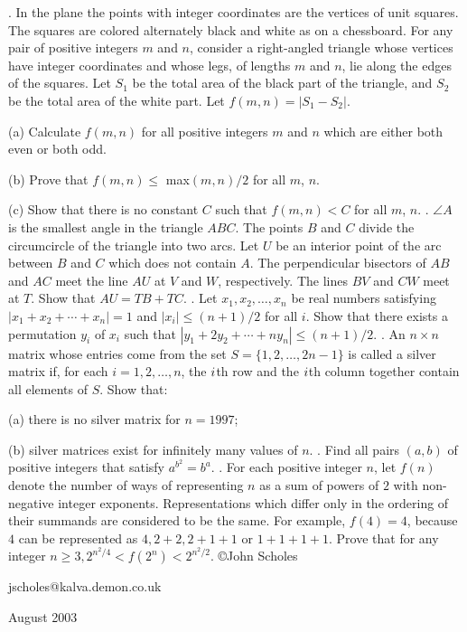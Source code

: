 \nopagenumbers
{}
\vskip 25pt
. In the plane the points with integer coordinates are the vertices of unit squares. The squares are colored alternately black and white as on a chessboard. For any pair of positive integers $m$ and $n$, consider a right-angled triangle whose vertices have integer coordinates and whose legs, of lengths $m$ and $n$, lie along the edges of the squares. Let $S_1$ be the total area of the black part of the triangle, and $S_2$ be the total area of the white part. Let $f(m, n) = |S_1 - S_2|$.

(a) Calculate $f(m,n)$ for all positive integers $m$ and $n$ which are either both even or both odd.

(b) Prove that $f(m,n) \le$ max$(m,n)/2$ for all $m$, $n$.

(c) Show that there is no constant $C$ such that $f(m,n) < C$ for all $m$, $n$.
\vskip 12pt
. $\angle A$ is the smallest angle in the triangle $ABC$. The points $B$ and $C$ divide the circumcircle of the triangle into two arcs. Let $U$ be an interior point of the arc between $B$ and $C$ which does not contain $A$. The perpendicular bisectors of $AB$ and $AC$ meet the line $AU$ at $V$ and $W$, respectively. The lines $BV$ and $CW$ meet at $T$. Show that $AU = TB + TC$.
\vskip 12pt
. Let $x_1, x_2, \ldots , x_n$ be real numbers satisfying $|x_1 + x_2 + \cdots + x_n| = 1$ and $|x_i| \le (n+1)/2$ for all $i$. Show that there exists a permutation $y_i$ of $x_i$ such that $|y_1 + 2 y_2 + \cdots + n y_n| \le (n+1)/2$.
\vskip 12pt
. An $n \times n$ matrix whose entries come from the set $S = \{1, 2, \ldots , 2n-1\}$ is called a silver matrix if, for each $i = 1, 2, \ldots , n$, the $i\/$th row and the $i\/$th column together contain all elements of $S$. Show that:

(a) there is no silver matrix for $n = 1997$;

(b) silver matrices exist for infinitely many values of $n$.
\vskip 12pt
. Find all pairs $(a,b)$ of positive integers that satisfy $a^{b^2} = b^a$.
\vskip 12pt
. For each positive integer $n$, let $f(n)$ denote the number of ways of representing $n$ as a sum of powers of $2$ with non-negative integer exponents. Representations which differ only in the ordering of their summands are considered to be the same. For example, $f(4) = 4$, because $4$ can be represented as $4, 2+2, 2+1+1$ or $1+1+1+1$. Prove that for any integer $n \ge 3, 2^{n^2/4} < f(2^n) < 2^{n^2/2}$.
\vskip 20pt
\noindent \copyright John Scholes

\noindent jscholes@kalva.demon.co.uk

 August 2003

\bye
